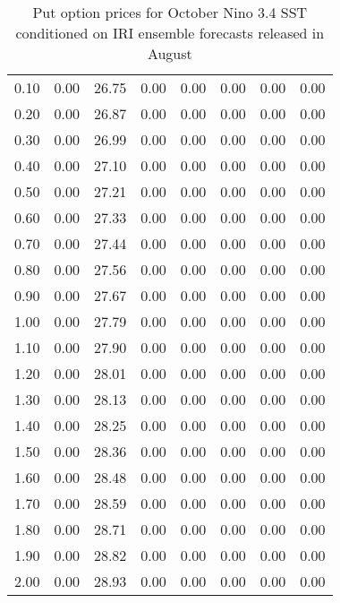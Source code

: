 \begin{table*}[ht]
\begin{tabular}{rrrrrrrr}
  0.10 & 0.00 & 26.75 & 0.00 & 0.00 & 0.00 & 0.00 & 0.00 \\ 
  0.20 & 0.00 & 26.87 & 0.00 & 0.00 & 0.00 & 0.00 & 0.00 \\ 
  0.30 & 0.00 & 26.99 & 0.00 & 0.00 & 0.00 & 0.00 & 0.00 \\ 
  0.40 & 0.00 & 27.10 & 0.00 & 0.00 & 0.00 & 0.00 & 0.00 \\ 
  0.50 & 0.00 & 27.21 & 0.00 & 0.00 & 0.00 & 0.00 & 0.00 \\ 
  0.60 & 0.00 & 27.33 & 0.00 & 0.00 & 0.00 & 0.00 & 0.00 \\ 
  0.70 & 0.00 & 27.44 & 0.00 & 0.00 & 0.00 & 0.00 & 0.00 \\ 
  0.80 & 0.00 & 27.56 & 0.00 & 0.00 & 0.00 & 0.00 & 0.00 \\ 
  0.90 & 0.00 & 27.67 & 0.00 & 0.00 & 0.00 & 0.00 & 0.00 \\ 
  1.00 & 0.00 & 27.79 & 0.00 & 0.00 & 0.00 & 0.00 & 0.00 \\ 
  1.10 & 0.00 & 27.90 & 0.00 & 0.00 & 0.00 & 0.00 & 0.00 \\ 
  1.20 & 0.00 & 28.01 & 0.00 & 0.00 & 0.00 & 0.00 & 0.00 \\ 
  1.30 & 0.00 & 28.13 & 0.00 & 0.00 & 0.00 & 0.00 & 0.00 \\ 
  1.40 & 0.00 & 28.25 & 0.00 & 0.00 & 0.00 & 0.00 & 0.00 \\ 
  1.50 & 0.00 & 28.36 & 0.00 & 0.00 & 0.00 & 0.00 & 0.00 \\ 
  1.60 & 0.00 & 28.48 & 0.00 & 0.00 & 0.00 & 0.00 & 0.00 \\ 
  1.70 & 0.00 & 28.59 & 0.00 & 0.00 & 0.00 & 0.00 & 0.00 \\ 
  1.80 & 0.00 & 28.71 & 0.00 & 0.00 & 0.00 & 0.00 & 0.00 \\ 
  1.90 & 0.00 & 28.82 & 0.00 & 0.00 & 0.00 & 0.00 & 0.00 \\ 
  2.00 & 0.00 & 28.93 & 0.00 & 0.00 & 0.00 & 0.00 & 0.00 \\ 
   \hline
\end{tabular}
\caption{Put option prices for October Nino 3.4 SST conditioned on IRI ensemble forecasts released in August} 
\end{table*}

